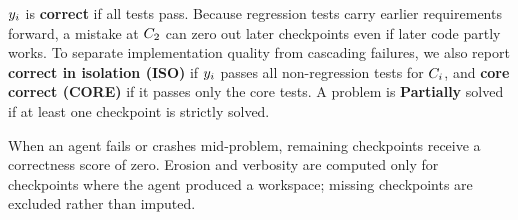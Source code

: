 $y_{i}$ is \textbf{correct} if all tests pass. Because regression tests carry earlier requirements forward, a mistake at $C_{2}$ can zero out later checkpoints even if later code partly works. To separate implementation quality from cascading failures, we also report \textbf{correct in isolation (ISO)} if $y_{i}$ passes all non-regression tests for $C_{i}$, and \textbf{core correct (CORE)} if it passes only the core tests. A problem is \textbf{Partially} solved if at least one checkpoint is strictly solved.

When an agent fails or crashes mid-problem, remaining checkpoints receive a correctness score of zero. Erosion and verbosity are computed only for checkpoints where the agent produced a workspace; missing checkpoints are excluded rather than imputed.
